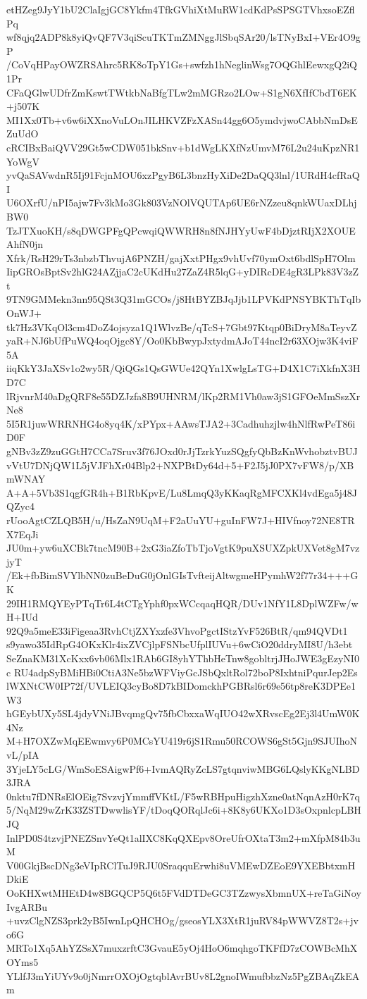 etHZeg9JyY1bU2ClaIgjGC8Ykfm4TfkGVhiXtMuRW1cdKdPsSPSGTVhxsoEZflPq
wf8qjq2ADP8k8yiQvQF7V3qiScuTKTmZMNggJlSbqSAr20/lsTNyBxI+VEr4O9gP
/CoVqHPayOWZRSAhrc5RK8oTpY1Gs+swfzh1hNeglinWsg7OQGhlEewxgQ2iQ1Pr
CFaQGlwUDfrZmKswtTWtkbNaBfgTLw2mMGRzo2LOw+S1gN6XfIfCbdT6EK+j507K
MI1Xx0Tb+v6w6iXXnoVuLOnJILHKVZFzXASn44gg6O5ymdvjwoCAbbNmDsEZuUdO
cRCIBxBaiQVV29Gt5wCDW051bkSnv+b1dWgLKXfNzUmvM76L2u24uKpzNR1YoWgV
yvQaSAVwdnR5Ij91FcjnMOU6xzPgyB6L3bnzHyXiDe2DaQQ3lnl/1URdH4cfRaQI
U6OXrfU/nPI5ajw7Fv3kMo3Gk803VzNOlVQUTAp6UE6rNZzeu8qnkWUaxDLhjBW0
TzJTXuoKH/s8qDWGPFgQPcwqiQWWRH8n8fNJHYyUwF4bDjztRIjX2XOUEAhfN0jn
Xfrk/RsH29rTs3nbzbThvujA6PNZH/gajXxtPHgx9vhUvf70ymOxt6bdlSpH7Olm
IipGROsBptSv2hlG24AZjjaC2cUKdHu27ZaZ4R5lqG+yDIRcDE4gR3LPk83V3zZt
9TN9GMMekn3nn95QSt3Q31mGCOs/j8HtBYZBJqJjb1LPVKdPNSYBKThTqIbOnWJ+
tk7Hz3VKqOl3cm4DoZ4ojsyza1Q1WlvzBe/qTcS+7Gbt97Ktqp0BiDryM8aTeyvZ
yaR+NJ6bUfPuWQ4oqOjgc8Y/Oo0KbBwypJxtydmAJoT44ncI2r63XOjw3K4viF5A
iiqKkY3JaXSv1o2wy5R/QiQGs1QsGWUe42QYn1XwlgLsTG+D4X1C7iXkfnX3HD7C
lRjvnrM40aDgQRF8e55DZJzfa8B9UHNRM/lKp2RM1Vh0aw3jS1GFOeMmSszXrNe8
5I5R1juwWRRNHG4o8yq4K/xPYpx+AAwsTJA2+3Cadhuhzjlw4hNlfRwPeT86iD0F
gNBv3zZ9zuGGtH7CCa7Sruv3f76JOxd0rJjTzrkYuzSQgfyQbBzKnWvhobztvBUJ
vVtU7DNjQW1L5jVJFhXr04Blp2+NXPBtDy64d+5+F2J5jJ0PX7vFW8/p/XBmWNAY
A+A+5Vb3S1qgfGR4h+B1RbKpvE/Lu8LmqQ3yKKaqRgMFCXKl4vdEga5j48JQZyc4
rUooAgtCZLQB5H/u/HsZaN9UqM+F2aUuYU+guInFW7J+HIVfnoy72NE8TRX7EqJi
JU0m+yw6uXCBk7tncM90B+2xG3iaZfoTbTjoVgtK9puXSUXZpkUXVet8gM7vzjyT
/Ek+fbBimSVYlbNN0zuBeDuG0jOnlGIsTvfteijAltwgmeHPymhW2f77r34+++GK
29IH1RMQYEyPTqTr6L4tCTgYphf0pxWCcqaqHQR/DUv1NfY1L8DplWZFw/wH+IUd
92Q9a5meE33iFigeaa3RvhCtjZXYxzfe3VhvoPgctIStzYvF526BtR/qm94QVDt1
s9yawo35IdRpG4OKxKlr4ixZVCjlpFSNbcUfplIUVu+6wCiO20ddryMI8U/h3ebt
SeZnaKM31XcKxx6vb06Mlx1RAb6GI8yhYThbHeTnw8gobltrjJHoJWE3gEzyNI0c
RU4adpSyBMiHBi0CtiA3Ne5bzWFViyGcJSbQxltRol72boP8IxhtniPqurJep2Es
lWXNtCW0IP72f/UVLEIQ3cyBo8D7kBIDomckhPGBRsl6r69e56tp8reK3DPEe1W3
hGEybUXy5SL4jdyVNiJBvqmgQv75fbCbxxaWqIUO42wXRvscEg2Ej3l4UmW0K4Nz
M+H7OXZwMqEEwmvy6P0MCsYU419r6jS1Rmu50RCOWS6gSt5Gjn9SJUIhoNvL/pIA
3YjeLY5cLG/WmSoESAigwPf6+IvmAQRyZcLS7gtqnviwMBG6LQslyKKgNLBD3JRA
0nktu7fDNRsElOEig7SvzvjYmmffVKtL/F5wRBHpuHigzhXzne0atNqnAzH0rK7q
5/NqM29wZrK33ZSTDwwlisYF/tDoqQORqlJc6i+8K8y6UKXo1D3sOxpnlcpLBHJQ
InlPD0S4tzvjPNEZSnvYeQt1alIXC8KqQXEpv8OreUfrOXtaT3m2+mXfpM84b3uM
V00GkjBscDNg3eVIpRClTuJ9RJU0SraqquErwhi8uVMEwDZEoE9YXEBbtxmHDkiE
OoKHXwtMHEtD4w8BGQCP5Q6t5FVdDTDeGC3TZzwysXbmnUX+reTaGiNoyIvgARBu
+uvzClgNZS3prk2yB5IwnLpQHCHOg/gseosYLX3XtR1juRV84pWWVZ8T2s+jvo6G
MRTo1Xq5AhYZSsX7muxzrftC3GvauE5yOj4HoO6mqhgoTKFfD7zCOWBcMhXOYms5
YLlfJ3mYiUYv9o0jNmrrOXOjOgtqblAvrBUv8L2gnoIWmufbbzNz5PgZBAqZkEAm
